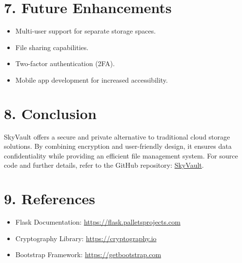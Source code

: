 \documentclass[12pt,a4paper]{article}
\begin{document}
\section*{7. Future Enhancements}
\begin{itemize}
    \item Multi-user support for separate storage spaces.
    \item File sharing capabilities.
    \item Two-factor authentication (2FA).
    \item Mobile app development for increased accessibility.
\end{itemize}

\section*{8. Conclusion}
SkyVault offers a secure and private alternative to traditional cloud storage solutions. By combining encryption and user-friendly design, it ensures data confidentiality while providing an efficient file management system. For source code and further details, refer to the GitHub repository: \href{https://github.com/PriyanshuKSharma/SkyVault.git}{SkyVault}.

\section*{9. References}
\begin{itemize}
    \item Flask Documentation: \url{https://flask.palletsprojects.com}
    \item Cryptography Library: \url{https://cryptography.io}
    \item Bootstrap Framework: \url{https://getbootstrap.com}
\end{itemize}
\end{document}
